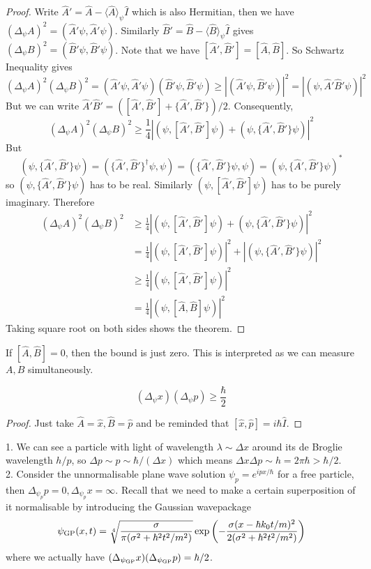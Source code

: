 \begin{proof}
    Write $\hat{A}'=\hat{A}-\langle\hat{A}\rangle_\psi\hat{I}$ which is also Hermitian, then we have $(\Delta_\psi A)^2=(\hat{A}'\psi,\hat{A}'\psi)$.
    Similarly $\hat{B}'=\hat{B}-\langle\hat{B}\rangle_\psi\hat{I}$ gives $(\Delta_\psi B)^2=(\hat{B}'\psi,\hat{B}'\psi)$.
    Note that we have $[\hat{A}',\hat{B}']=[\hat{A},\hat{B}]$.
    So Schwartz Inequality gives
    $$(\Delta_\psi A)^2(\Delta_\psi B)^2=(\hat{A}'\psi,\hat{A}'\psi)(\hat{B}'\psi,\hat{B}'\psi)\ge|(\hat{A}'\psi,\hat{B}'\psi)|^2=|(\psi,\hat{A}'\hat{B}'\psi)|^2$$
    But we can write $\hat{A}'\hat{B}'=([\hat{A}',\hat{B}']+\{\hat{A}',\hat{B}'\})/2$.
    Consequently,
    $$(\Delta_\psi A)^2(\Delta_\psi B)^2\ge \frac{1}{4}|(\psi,[\hat{A}',\hat{B}']\psi)+(\psi,\{\hat{A}',\hat{B}'\}\psi) |^2$$
    But
    $$(\psi,\{\hat{A}',\hat{B}'\}\psi)=(\{\hat{A}',\hat{B}'\}^\dagger\psi,\psi)=(\{\hat{A}',\hat{B}'\}\psi,\psi)=(\psi,\{\hat{A}',\hat{B}'\}\psi)^*$$
    so $(\psi,\{\hat{A}',\hat{B}'\}\psi)$ has to be real.
    Similarly $(\psi,[\hat{A}',\hat{B}']\psi)$ has to be purely imaginary.
    Therefore
    \begin{align*}
        (\Delta_\psi A)^2(\Delta_\psi B)^2&\ge \frac{1}{4}|(\psi,[\hat{A}',\hat{B}']\psi)+(\psi,\{\hat{A}',\hat{B}'\}\psi) |^2\\
        &=\frac{1}{4}|(\psi,[\hat{A}',\hat{B}']\psi)|^2+|(\psi,\{\hat{A}',\hat{B}'\}\psi) |^2\\
        &\ge\frac{1}{4}|(\psi,[\hat{A}',\hat{B}']\psi)|^2\\
        &=\frac{1}{4}|(\psi,[\hat{A},\hat{B}]\psi)|^2
    \end{align*}
    Taking square root on both sides shows the theorem.
\end{proof}
If $[\hat{A},\hat{B}]=0$, then the bound is just zero.
This is interpreted as we can measure $A,B$ simultaneously.
\begin{corollary}
    $$(\Delta_\psi x)(\Delta_\psi p)\ge\frac{\hbar}{2}$$
\end{corollary}
\begin{proof}
    Just take $\hat{A}=\hat{x},\hat{B}=\hat{p}$ and be reminded that $[\hat{x},\hat{p}]=i\hbar\hat{I}$.
\end{proof}
\begin{example}
    1. We can see a particle with light of wavelength $\lambda\sim\Delta x$ around its de Broglie wavelength $h/p$, so $\Delta p\sim p\sim\hbar/(\Delta x)$ which means $\Delta x\Delta p\sim h=2\pi\hbar>\hbar/2$.\\
    2. Consider the unnormalisable plane wave solution $\psi_p=e^{ipx/\hbar}$ for a free particle, then $\Delta_{\psi_p}p=0,\Delta_{\psi_p}x=\infty$.
    Recall that we need to make a certain superposition of it normalisable by introducing the Gaussian wavepackage
    $$\psi_{\rm GP}(x,t)=\sqrt[4]{\frac{\sigma}{\pi(\sigma^2+\hbar^2t^2/m^2)}}\exp\left( -\frac{\sigma(x-\hbar k_0t/m)^2}{2(\sigma^2+\hbar^2t^2/m^2)} \right)$$
    where we actually have $(\Delta_{\psi_{\rm GP}}x)(\Delta_{\psi_{\rm GP}}p)=\hbar/2$.
\end{example}
